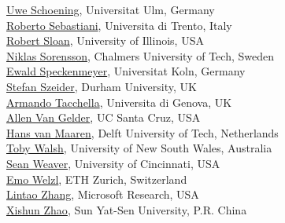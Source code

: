 \documentclass[10pt]{article}
\begin{document}
\begin{minipage}[t]{7.5cm}
{          \href{http://theorie.informatik.uni-ulm.de/Personen/Schoening/index.html}{Uwe Schoening}, Universitat Ulm, Germany   \\
          \href{http://www.dit.unitn.it/~rseba/}{Roberto Sebastiani}, Universita di Trento, Italy  \\
          \href{http://www.cs.uic.edu/~sloan/}{Robert Sloan}, University of Illinois, USA  \\
          \href{http://www.cs.chalmers.se/~nik/}{Niklas Sorensson}, Chalmers University of Tech, Sweden  \\
          \href{http://www.scale.uni-koeln.de/}{Ewald Speckenmeyer}, Universitat Koln, Germany  \\
          \href{http://www.dur.ac.uk/stefan.szeider/}{Stefan Szeider}, Durham University, UK  \\
          \href{http://www.mrg.dist.unige.it/~tac/}{Armando Tacchella}, Universita di Genova, UK  \\
          \href{http://www.soe.ucsc.edu/~avg/}{Allen Van Gelder}, UC Santa Cruz, USA  \\
          \href{http://www.st.ewi.tudelft.nl/~maaren/}{Hans van Maaren},  Delft University of Tech, Netherlands  \\
          \href{http://www.cse.unsw.edu.au/~tw/}{Toby Walsh}, University of New South Wales, Australia  \\
          \href{http://www.cs.uc.edu/~weaversa/}{Sean Weaver}, University of Cincinnati, USA  \\
          \href{http://www.inf.ethz.ch/personal/emo/}{Emo Welzl}, ETH Zurich, Switzerland  \\
          \href{http://research.microsoft.com/users/lintaoz/}{Lintao Zhang}, Microsoft Research, USA  \\
          \href{http://logic.sysu.edu.cn/2005/english/PEOPLE/200510/english_277.html}{Xishun Zhao}, Sun Yat-Sen University, P.R. China  \\
}
\end{minipage}
\hspace*{0.35cm}
\end{document}
